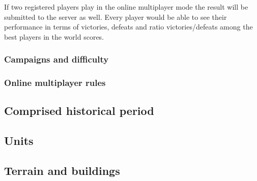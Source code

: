 If two registered players play in the online multiplayer mode the result will
be submitted to the server as well. Every player would be able to see their
performance in terms of victories, defeats and ratio victories/defeats among
the best players in the world scores.\\

\subsubsection{Campaigns and difficulty}

\subsubsection{Online multiplayer rules}


\subsection{Comprised historical period}

\subsection{Units}

\subsection{Terrain and buildings}
